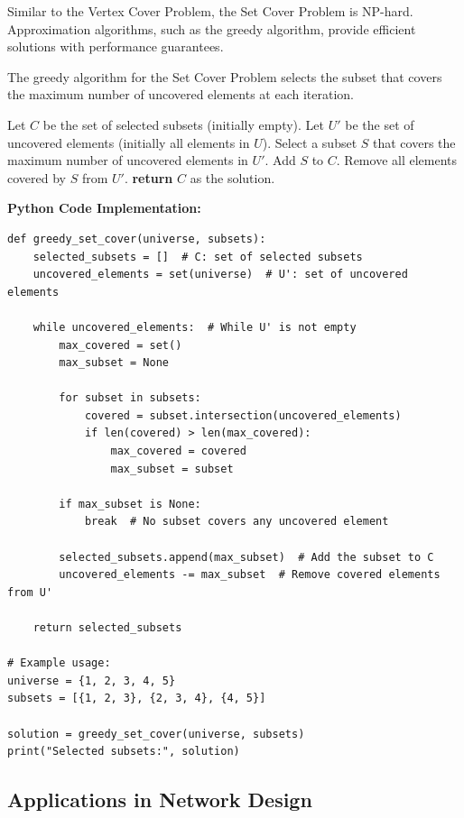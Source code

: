 \documentclass[12pt]{book} %
\begin{document}
Similar to the Vertex Cover Problem, the Set Cover Problem is NP-hard. Approximation algorithms, such as the greedy algorithm, provide efficient solutions with performance guarantees.


The greedy algorithm for the Set Cover Problem selects the subset that covers the maximum number of uncovered elements at each iteration.
\FloatBarrier
\begin{algorithm}[H]
\caption{Greedy Algorithm for Set Cover}
\begin{algorithmic}[1]
\State Let \( C \) be the set of selected subsets (initially empty).
\State Let \( U' \) be the set of uncovered elements (initially all elements in \( U \)).
    \State Select a subset \( S \) that covers the maximum number of uncovered elements in \( U' \).
    \State Add \( S \) to \( C \).
    \State Remove all elements covered by \( S \) from \( U' \).
\EndWhile
\State \textbf{return} \( C \) as the solution.
\end{algorithmic}
\end{algorithm}
\FloatBarrier

\textbf{Python Code Implementation:}
\FloatBarrier
\begin{lstlisting}
def greedy_set_cover(universe, subsets):
    selected_subsets = []  # C: set of selected subsets
    uncovered_elements = set(universe)  # U': set of uncovered elements

    while uncovered_elements:  # While U' is not empty
        max_covered = set()
        max_subset = None

        for subset in subsets:
            covered = subset.intersection(uncovered_elements)
            if len(covered) > len(max_covered):
                max_covered = covered
                max_subset = subset

        if max_subset is None:
            break  # No subset covers any uncovered element

        selected_subsets.append(max_subset)  # Add the subset to C
        uncovered_elements -= max_subset  # Remove covered elements from U'

    return selected_subsets

# Example usage:
universe = {1, 2, 3, 4, 5}
subsets = [{1, 2, 3}, {2, 3, 4}, {4, 5}]

solution = greedy_set_cover(universe, subsets)
print("Selected subsets:", solution)
\end{lstlisting}

\subsection{Applications in Network Design}
\end{document}

